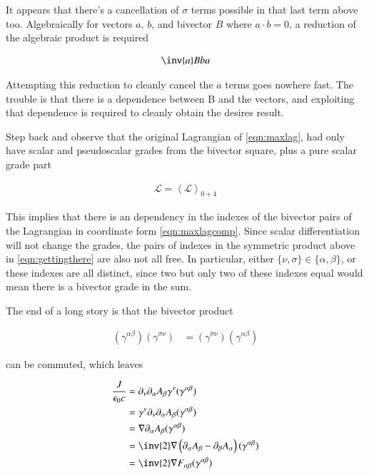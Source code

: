 \documentclass{article}
\newcommand{\LL}[0]{\mathcal{L}}
\newcommand{\grad}[0]{\nabla}
\newcommand{\gpgrade}[2] {{\left\langle{{#1}}\right\rangle}_{#2}}
\begin{document}
It appears that there's a cancellation of $\sigma$ terms possible in that last term above too.  Algebraically
for vectors $a$, $b$, and bivector $B$ where $a \cdot b = 0$, a reduction of the algebraic product is required

\begin{align*}
\inv{a} B b a
\end{align*}

Attempting this reduction to cleanly cancel the $a$ terms goes nowhere fast.  The trouble is that there
is a dependence between B and the vectors, and exploiting that dependence is required to cleanly obtain the desires
result.

Step back and observe that the original Lagrangian of \ref{eqn:maxlag}, 
had only have scalar and pseudoscalar grades from the bivector square, plus a pure scalar grade part

\begin{align*}
\LL = \gpgrade{\LL}{0+4}
\end{align*}

This implies that there is an dependency in the indexes of the
bivector pairs of the Lagrangian in coordinate form \ref{eqn:maxlagcomp}.
Since scalar differentiation will not change the grades, the pairs
of indexes in the symmetric product above in \ref{eqn:gettingthere} are also not all free.
In particular, either $\{\nu, \sigma\} \in \{\alpha, \beta\}$, or these indexes are all distinct, since two but only two
of these indexes equal would mean there is a bivector grade in the sum.  

The end of a long story is that the bivector product

\begin{align*}
(\gamma^{\alpha\beta}) (\gamma^{\sigma\nu})
&=
(\gamma^{\sigma\nu}) (\gamma^{\alpha\beta})
\end{align*}

can be commuted, which leaves

\begin{align*}
\frac{J}{\epsilon_0 c}
&= \partial_\nu \partial_\alpha A_\beta \gamma^{\nu} (\gamma^{\alpha\beta}) \\
&= \gamma^\nu \partial_\nu \partial_\alpha A_\beta (\gamma^{\alpha\beta}) \\
&= \grad \partial_\alpha A_\beta (\gamma^{\alpha\beta}) \\
&= \inv{2} \grad \left(\partial_\alpha A_\beta - \partial_\beta A_\alpha \right) (\gamma^{\alpha\beta}) \\
&= \inv{2} \grad F_{\alpha\beta} (\gamma^{\alpha\beta}) \\
\end{align*}
\end{document}
